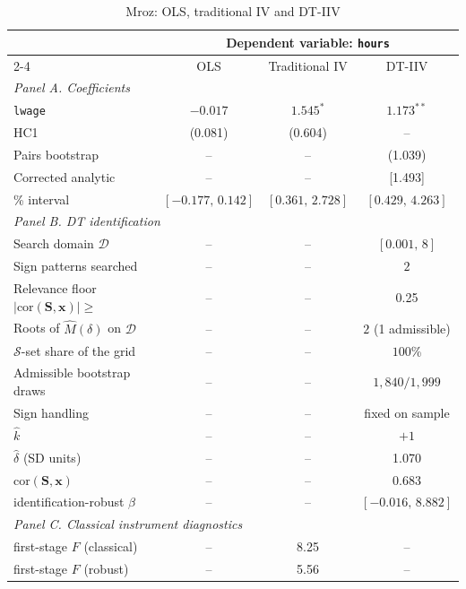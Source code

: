 \begin{table}[htbp]
\centering
\caption{Mroz: OLS, traditional IV and DT-IIV}
\label{tab:mroz_results}
\begin{threeparttable}
\begin{tabular}{lccc}
\toprule
& \multicolumn{3}{c}{Dependent variable: \texttt{hours}} \\
\cmidrule(lr){2-4}
 & OLS & Traditional IV & DT-IIV \\
\midrule
\multicolumn{4}{l}{\emph{Panel A. Coefficients}} \\
\texttt{lwage} & $-0.017$ & $1.545^{*}$ & $1.173^{**}$ \\
\quad HC1 & (0.081) & (0.604) & -- \\
\quad Pairs bootstrap & -- & -- & (1.039) \\
\quad Corrected analytic & -- & -- & [1.493] \\
\quad 95\% interval & $[-0.177,\,0.142]$ & $[0.361,\,2.728]$ & $[0.429,\,4.263]$ \\[3pt]
\midrule
\multicolumn{4}{l}{\emph{Panel B. DT identification}} \\
\quad Search domain $\mathcal D$ & -- & -- & $[0.001,\,8]$ \\
\quad Sign patterns searched & -- & -- & $2$ \\
\quad Relevance floor $|\mathrm{cor}(\mathbf S,\mathbf x)|\ge$ & -- & -- & 0.25 \\
\quad Roots of $\widehat M(\delta)$ on $\mathcal D$ & -- & -- & $2$ (1 admissible) \\
\quad $\mathcal S$-set share of the grid & -- & -- & $100$\% \\
\quad Admissible bootstrap draws & -- & -- & $1{,}840/1{,}999$ \\
\quad Sign handling & -- & -- & fixed on sample \\
\quad $\widehat k$ & -- & -- & $+1$ \\
\quad $\widehat\delta$ (SD units) & -- & -- & 1.070 \\
\quad $\mathrm{cor}(\mathbf S,\mathbf x)$ & -- & -- & 0.683 \\
\quad identification-robust $\beta$ & -- & -- & $[-0.016,\,8.882]$ \\[3pt]
\midrule
\multicolumn{4}{l}{\emph{Panel C. Classical instrument diagnostics}} \\
\quad first-stage $F$ (classical) & -- & 8.25 & -- \\
\quad first-stage $F$ (robust) & -- & 5.56 & -- \\

\end{tabular}
\end{threeparttable}
\end{table}

